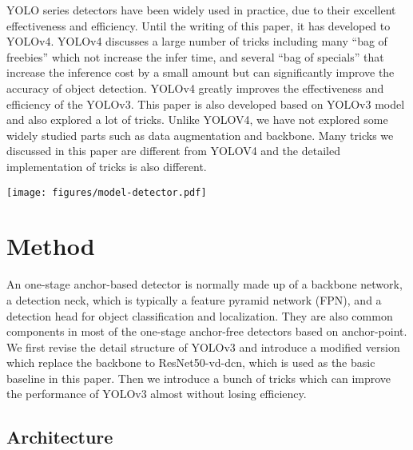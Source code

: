 \documentclass[10pt,twocolumn,letterpaper]{article}
\begin{document}
	YOLO series detectors \cite{YOLO16,yolov2,yolov3,yolov4}  have been widely used in practice, due to their excellent effectiveness and efficiency.
	Until the writing of this paper, it has developed to YOLOv4\cite{yolov4}. YOLOv4 discusses a large number of tricks including many ``bag of freebies'' which not increase the infer time, and several ``bag of specials'' that increase the inference cost by a small amount but can significantly improve the accuracy of object detection. YOLOv4 greatly improves the effectiveness and efficiency of the YOLOv3\cite{yolov3}. This paper is also developed based on YOLOv3 model and also explored a lot of tricks.  Unlike YOLOV4, we have not explored some widely studied parts such as data augmentation and backbone. Many tricks we discussed in this paper are different from YOLOV4 and the detailed implementation of tricks is also different.
	
	\begin{figure*}[t!]
		\centering
		\texttt{[image: figures/model-detector.pdf]}\\
		\caption{The network architecture of YOLOv3 and inject points for PP-YOLO. Activation layers are omitted for brevity. Details are described in Section \ref{sec:yolov3} and Section \ref{sec:tricks}.}
		\label{fig:yolov3}
	\end{figure*}
	
	
	\section{Method}
	An one-stage anchor-based detector is normally made up of a backbone network, a detection neck, which is typically a feature pyramid network (FPN), and a detection head for object classification and localization. They are also common components in most of the one-stage anchor-free detectors based on anchor-point. 
	We first revise the detail structure of YOLOv3 and introduce a modified version which replace the backbone to ResNet50-vd-dcn, which is used as the basic baseline in this paper.  Then we introduce a bunch of tricks which can improve the performance of YOLOv3 almost without losing efficiency.
	
	\subsection{Architecture} \label{sec:yolov3}
	
\end{document}
